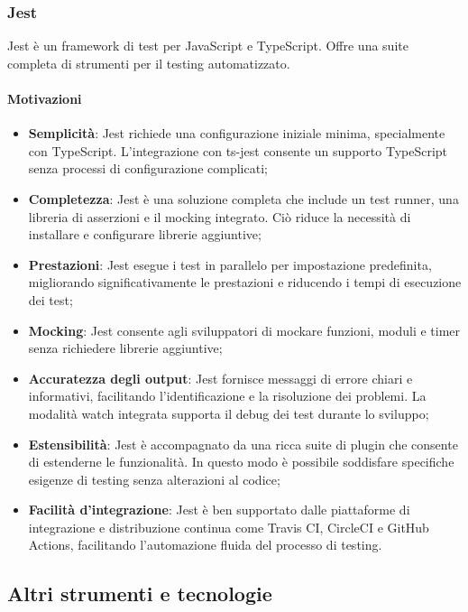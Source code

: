 \subsubsection{Jest}\label{sec:jest}
\par Jest è un framework di test per JavaScript e TypeScript. Offre una suite completa di strumenti per il testing automatizzato.
\paragraph*{Motivazioni}
\begin{itemize}
  \item \textbf{Semplicità}: Jest richiede una configurazione iniziale minima, specialmente con TypeScript. L'integrazione con ts-jest consente un supporto TypeScript senza processi di configurazione complicati;
  \item \textbf{Completezza}: Jest è una soluzione completa che include un test runner, una libreria di asserzioni e il mocking integrato. Ciò riduce la necessità di installare e configurare librerie aggiuntive;
  \item \textbf{Prestazioni}: Jest esegue i test in parallelo per impostazione predefinita, migliorando significativamente le prestazioni e riducendo i tempi di esecuzione dei test;
  \item \textbf{Mocking}: Jest consente agli sviluppatori di mockare funzioni, moduli e timer senza richiedere librerie aggiuntive;
  \item \textbf{Accuratezza degli output}: Jest fornisce messaggi di errore chiari e informativi, facilitando l'identificazione e la risoluzione dei problemi. La modalità watch integrata supporta il debug dei test durante lo sviluppo;
  \item \textbf{Estensibilità}: Jest è accompagnato da una ricca suite di plugin che consente di estenderne le funzionalità. In questo modo è possibile soddisfare specifiche esigenze di testing senza alterazioni al codice;
  \item \textbf{Facilità d'integrazione}: Jest è ben supportato dalle piattaforme di integrazione e distribuzione continua come Travis CI, CircleCI e GitHub Actions, facilitando l'automazione fluida del processo di testing.
\end{itemize}

\subsection{Altri strumenti e tecnologie}\label{sec:tecnologie-generali}

